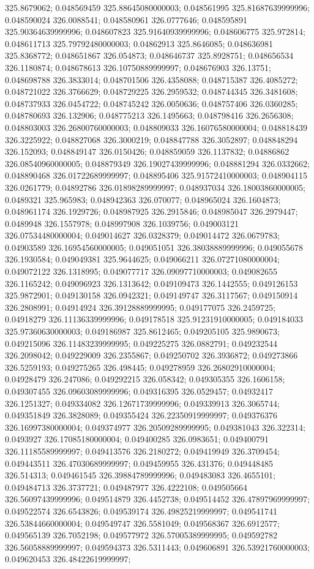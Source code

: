325.8679062; 0.048569459 325.88645080000003; 0.048561995 325.81687639999996; 0.048590024 326.0088541; 0.048580961 326.0777646; 0.048595891 325.90364639999996; 0.048607823 325.91640939999996; 0.048606775 325.972814; 0.048611713 325.79792480000003; 0.04862913 325.8646085; 0.048636981 325.8368772; 0.048651867 326.054873; 0.048646737 325.8928751; 0.048656534 326.1180874; 0.048678613 326.10750889999997; 0.048676903 326.13751; 0.048698788 326.3833014; 0.048701506 326.4358088; 0.048715387 326.4085272; 0.048721022 326.3766629; 0.048729225 326.2959532; 0.048744345 326.3481608; 0.048737933 326.0454722; 0.048745242 326.0050636; 0.048757406 326.0360285; 0.048780693 326.132906; 0.048775213 326.1495663; 0.048798416 326.2656308; 0.048803003 326.26800760000003; 0.048809033 326.16076580000004; 0.048818439 326.3225922; 0.048827068 326.3000219; 0.048847788 326.3052897; 0.048848294 326.152093; 0.048849147 326.0150426; 0.048859059 326.1137832; 0.04886862 326.08540960000005; 0.048879349 326.19027439999996; 0.048881294 326.0332662; 0.048890468 326.01722689999997; 0.048895406 325.91572410000003; 0.048904115 326.0261779; 0.04892786 326.01898289999997; 0.048937034 326.18003860000005; 0.0489321 325.965983; 0.048942363 326.070077; 0.048965024 326.1604873; 0.048961174 326.1929726; 0.048987925 326.2915846; 0.048985047 326.2979447; 0.0489948 326.1557978; 0.048997908 326.1039756; 0.049003121 326.07534480000004; 0.049014627 326.0328379; 0.049014472 326.0679783; 0.04903589 326.16954560000005; 0.049051051 326.38038889999996; 0.049055678 326.1930584; 0.049049381 325.9644625; 0.049066211 326.07271080000004; 0.049072122 326.1318995; 0.049077717 326.09097710000003; 0.049082655 326.1165242; 0.049096923 326.1313642; 0.049109473 326.1442555; 0.049126153 325.9872901; 0.049130158 326.0942321; 0.049149747 326.3117567; 0.049150914 326.2808991; 0.04914924 326.39128889999995; 0.049177075 326.2459725; 0.04918279 326.11136339999996; 0.049178518 325.91231910000005; 0.049184033 325.97360630000003; 0.049186987 325.8612465; 0.049205105 325.9890673; 0.049215096 326.11483239999995; 0.049225275 326.0882791; 0.049232544 326.2098042; 0.049229009 326.2355867; 0.049250702 326.3936872; 0.049273866 326.5259193; 0.049275265 326.498445; 0.049278959 326.26802910000004; 0.04928479 326.247086; 0.049292215 326.058342; 0.049305355 326.1606158; 0.049307455 326.09603089999996; 0.049316395 326.0529457; 0.04932417 326.1251327; 0.049334082 326.12671739999996; 0.049339913 326.3065744; 0.049351849 326.3828089; 0.049355424 326.22350919999997; 0.049376376 326.16997380000004; 0.049374977 326.20509289999995; 0.049381043 326.322314; 0.0493927 326.17085180000004; 0.049400285 326.0983651; 0.049400791 326.11185589999997; 0.049413576 326.2180272; 0.049419949 326.3709454; 0.049443511 326.47030689999997; 0.049459955 326.431376; 0.049448485 326.514313; 0.049461545 326.39884789999996; 0.049483083 326.4655101; 0.049484713 326.3737721; 0.049487977 326.4222108; 0.049505664 326.56097439999996; 0.049514879 326.4452738; 0.049514452 326.47897969999997; 0.049522574 326.6543826; 0.049539174 326.49825219999997; 0.049541741 326.53844660000004; 0.049549747 326.5581049; 0.049568367 326.6912577; 0.049565139 326.7052198; 0.049577972 326.57005389999995; 0.049592782 326.56058889999997; 0.049594373 326.5311443; 0.049606891 326.53921760000003; 0.049620453 326.48422619999997; 